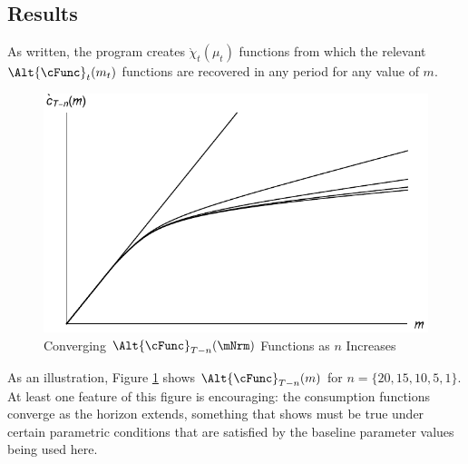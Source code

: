 \documentclass[titlepage, headings=optiontotocandhead]{\econtex}
\begin{document}
\hypertarget{Results}{}
\subsection{Results}

As written, the program creates \texttt{$\grave{\chi}_{t}(\mu_{t})$}
functions from which the relevant $\Alt{\cFunc}_{t}({m}_{t})$
functions are recovered in any period for any value of ${m}$.

\hypertarget{PlotCFuncsConverge}{}
\begin{figure}
  \includegraphics{./Figures/PlotCFuncsConverge}
  \caption{Converging $\Alt{\cFunc}_{T-n}({\mNrm})$ Functions as $n$ Increases}
  \label{fig:PlotCFuncsConverge}
\end{figure}


As an illustration, Figure \ref{fig:PlotCFuncsConverge} shows
$\Alt{\cFunc}_{T-n}({m})$ for $n=\{20,15,10,5,1\}$.  At least one
feature of this figure is encouraging: the consumption functions
converge as the horizon extends, something that \cite{BufferStockTheory}
shows must be true under certain parametric conditions that are
satisfied by the baseline parameter values being used here.
\end{document}
